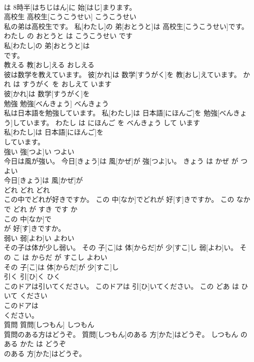 \documentclass[8pt]{extreport}
\begin{document}
\begin{CJK}{UTF8}{min}
\\	は 8時半[はちじはん]に 始[はじ]まります。		
\\	高校生	高校生[こうこうせい]	こうこうせい	
\\	私の弟は高校生です。	私[わたし]の 弟[おとうと]は 高校生[こうこうせい]です。	わたし の おとうと は こうこうせい です	
\\	私[わたし]の 弟[おとうと]は
\\	です。		
\\	教える	教[おし]える	おしえる	
\\	彼は数学を教えています。	彼[かれ]は 数学[すうがく]を 教[おし]えています。	かれ は すうがく を おしえて います	
\\	彼[かれ]は 数学[すうがく]を
\\	勉強	勉強[べんきょう]	べんきょう	
\\	私は日本語を勉強しています。	私[わたし]は 日本語[にほんご]を 勉強[べんきょう]しています。	わたし は にほんご を べんきょう して います	
\\	私[わたし]は 日本語[にほんご]を
\\	しています。		
\\	強い	強[つよ]い	つよい	
\\	今日は風が強い。	今日[きょう]は 風[かぜ]が 強[つよ]い。	きょう は かぜ が つよい	
\\	今日[きょう]は 風[かぜ]が
\\	どれ	どれ	どれ	
\\	この中でどれが好きですか。	この 中[なか]でどれが 好[す]きですか。	この なか で どれ が すき です か	
\\	この 中[なか]で
\\	が 好[す]きですか。		
\\	弱い	弱[よわ]い	よわい	
\\	その子は体が少し弱い。	その 子[こ]は 体[からだ]が 少[すこ]し 弱[よわ]い。	その こ は からだ が すこし よわい	
\\	その 子[こ]は 体[からだ]が 少[すこ]し
\\	引く	引[ひ]く	ひく	
\\	このドアは引いてください。	このドアは 引[ひ]いてください。	この どあ は ひいて ください	
\\	このドアは
\\	ください。		
\\	質問	質問[しつもん]	しつもん	
\\	質問のある方はどうぞ。	質問[しつもん]のある 方[かた]はどうぞ。	しつもん の ある かた は どうぞ	
\\	のある 方[かた]はどうぞ。		

\end{CJK}
\end{document}
